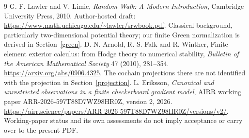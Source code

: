 \documentclass[11pt,a4paper]{article}
\begin{document}
\begin{thebibliography}{9}
 G. F. Lawler and V. Limic,
\emph{Random Walk: A Modern Introduction}, Cambridge University Press, 2010.
Author-hosted draft: \url{https://www.math.uchicago.edu/~lawler/srwbook.pdf}.
Classical background, particularly two-dimensional potential theory; our finite
Green normalization is derived in Section~\ref{green}.
 D. N. Arnold, R. S. Falk and R. Winther,
Finite element exterior calculus: from Hodge theory to numerical stability,
\emph{Bulletin of the American Mathematical Society} 47 (2010), 281--354.
\url{https://arxiv.org/abs/0906.4325}.
The cochain projections there are not identified with the projection in
Section~\ref{projection}.
 L. Eriksson,
\emph{Canonical and unrestricted observations in a finite checkerboard gradient
model}, AIRR working paper ARR-2026-597T88D7WZ98HR0Z, version 2, 2026.
\url{https://airr.science/papers/ARR-2026-597T88D7WZ98HR0Z/versions/v2/}.
Working-paper status and its own assessments do not imply acceptance or carry
over to the present PDF.
\end{thebibliography}
\end{document}
